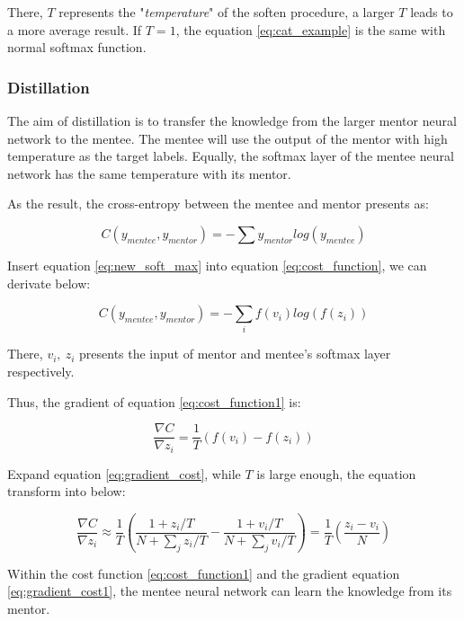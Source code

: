 \documentclass[article]{aaltoseries}
\begin{document}
There, \(T\) represents the "\emph{temperature}" of the soften procedure, a larger \(T\) leads to a more average result. 
If \(T =1\), the equation \ref{eq:cat_example} is the same with normal softmax function. 


\subsubsection{Distillation}

The aim of distillation is to transfer the knowledge from the larger mentor neural network to the mentee. 
The mentee will use the output of the mentor with high temperature as the target labels.
Equally, the softmax layer of the mentee neural network has the same temperature with its mentor.

As the result, the cross-entropy between the mentee and mentor presents as:

\begin{equation} \label{eq:cost_function}
  C(y_{mentee}, y_{mentor}) = - \sum y_{mentor}log(y_{mentee})
\end{equation}

Insert equation \ref{eq:new_soft_max} into equation \ref{eq:cost_function}, we can derivate below:

\begin{equation} \label{eq:cost_function1}
  C(y_{mentee}, y_{mentor}) = - \sum_i f(v_i)log(f(z_i))
\end{equation}

There, \(v_i,\ z_i\) presents the input of mentor and mentee's softmax layer respectively.

Thus, the gradient of equation \ref{eq:cost_function1} is:

\begin{equation} \label{eq:gradient_cost}
  \frac{\nabla C}{\nabla z_i} = \frac{1}{T}(f(v_i) - f(z_i))
\end{equation}

Expand equation \ref{eq:gradient_cost}, while \(T\) is large enough, the equation transform into below:

\begin{equation} \label{eq:gradient_cost1}
  \frac{\nabla C}{\nabla z_i} \approx \frac{1}{T}( \frac{1+z_i/T}{N+\sum_j z_i/T} - \frac{1+v_i/T}{N+\sum_j v_i/T} ) = \frac{1}{T} (\frac{z_i - v_i}{N})
\end{equation}

Within the cost function \ref{eq:cost_function1} and the gradient equation \ref{eq:gradient_cost1}, 
the mentee neural network can learn the knowledge from its mentor.
\end{document}
